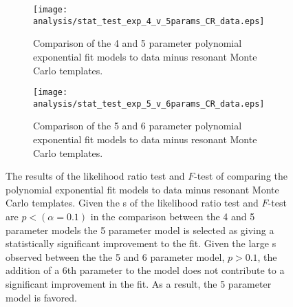 \begin{figure}[htbp]
 \centering
 \begin{subfigure}[t]{0.48\textwidth}
  \centering
  \texttt{[image: analysis/stat\_test\_exp\_4\_v\_5params\_CR\_data.eps]}
  \caption[Comparison of the 4 and 5 parameter polynomial exponential fit models.]{%
   Comparison of the 4 and 5 parameter polynomial exponential fit models to \CRQCD{} data minus resonant Monte Carlo templates.}
  \label{fig:stat_test_exp_4_v_5params}
 \end{subfigure}%
 \quad
 \begin{subfigure}[t]{0.48\textwidth}
  \centering
  \texttt{[image: analysis/stat\_test\_exp\_5\_v\_6params\_CR\_data.eps]}
  \caption[Comparison of the 5 and 6 parameter polynomial exponential fit models.]{%
   Comparison of the 5 and 6 parameter polynomial exponential fit models to \CRQCD{} data minus resonant Monte Carlo templates.}
  \label{fig:stat_test_exp_5_v_6params}
 \end{subfigure}
 \caption[Results of the likelihood ratio test and $F$-test of comparing the polynomial exponential fit models.]{%
  The results of the likelihood ratio test and $F$-test of comparing the polynomial exponential fit models to \CRQCD{} data minus resonant Monte Carlo templates.
  Given the \pvalue{}s of the likelihood ratio test and $F$-test are $p < \left(\alpha=0.1\right)$ in the comparison between the 4 and 5 parameter models the 5 parameter model is selected as giving a statistically significant improvement to the fit.
  Given the large \pvalue{}s observed between the the 5 and 6 parameter model, $p > 0.1$, the addition of a 6th parameter to the model does not contribute to a significant improvement in the fit.
  As a result, the 5 parameter model is favored.}
 \label{fig:likelihood_ratio_test_polyexp}
\end{figure}

